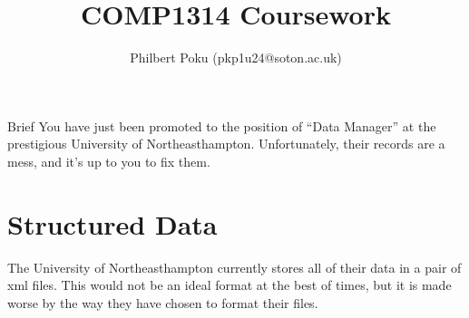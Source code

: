 \documentclass[12pt]{article}
\begin{document}
\title{COMP1314 Coursework}
\author{Philbert Poku (pkp1u24@soton.ac.uk)}
\date{}
\maketitle

Brief
You have just been promoted to the position of “Data Manager” at the prestigious University of Northeasthampton. Unfortunately, their records are a mess, and it’s up to you to fix them.
\section{Structured Data}
The University of Northeasthampton currently stores all of their data in a pair of xml files. This would not be an ideal format at the best of times, but it is made worse by the way they have chosen to format their files. 
\end{document}
